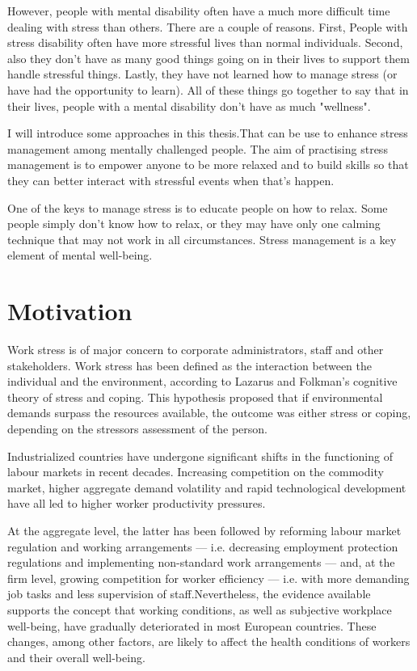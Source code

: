 However, people with mental disability often have a much more difficult time dealing with stress than others. There are a couple of reasons. First, People with stress disability often have more stressful lives than normal individuals. Second, also they don't have as many good things going on in their lives to support them handle stressful things. Lastly, they have not learned how to manage stress (or have had the opportunity to learn). All of these things go together to say that in their lives, people with a mental disability don't have as much "wellness".

I will introduce some approaches in this thesis.That can be use to enhance stress management among mentally challenged people. The aim of practising stress management is to empower anyone to be more relaxed and to build skills so that they can better interact with stressful events when that's happen.

One of the keys to manage stress is to educate people on how to relax. Some people simply don't know how to relax, or they may have only one calming technique that may not work in all circumstances. Stress management is a key element of mental well-being.

\section{Motivation}
Work stress is of major concern to corporate administrators, staff and other stakeholders. Work stress has been defined as the interaction between the individual and the environment, according to Lazarus and Folkman's cognitive theory of stress and coping\citep{LazarusR.S.Folkman1984StressCoping.}. This hypothesis proposed that if environmental demands surpass the resources available, the outcome was either stress or coping, depending on the stressors assessment of the person.

Industrialized countries have undergone significant shifts in the functioning of labour markets in recent decades. Increasing competition on the commodity market, higher aggregate demand volatility and rapid technological development have all led to higher worker productivity pressures. 

At the aggregate level, the latter has been followed by reforming labour market regulation and working arrangements — i.e. decreasing employment protection regulations and implementing non-standard work arrangements — and, at the firm level, growing competition for worker efficiency — i.e. with more demanding job tasks and less supervision of staff\citep{Cottini2013MentalEurope}.Nevertheless, the evidence available supports the concept that working conditions, as well as subjective workplace well-being, have gradually deteriorated in most European countries\citep{Llena-Nozal2009TheCountries}. These changes, among other factors, are likely to affect the health conditions of workers and their overall well-being.

